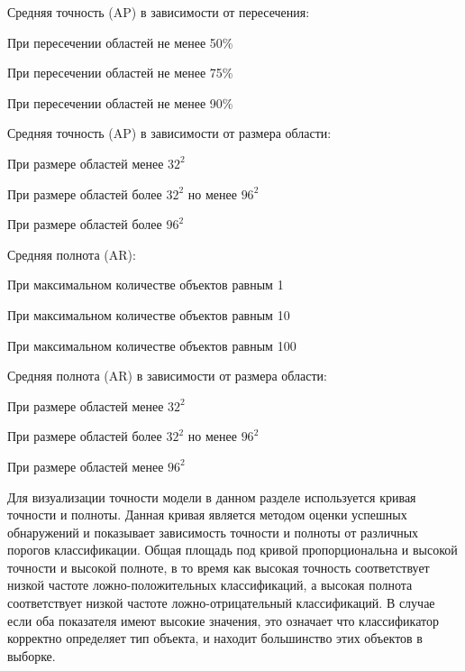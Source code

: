 %
\begin{itemize*}
  \item Средняя точность (AP) в зависимости от пересечения:
	\begin{itemize*}
	  \item При пересечении областей не менее 50\%
	  \item При пересечении областей не менее 75\%
	  \item При пересечении областей не менее 90\%	  
	\end{itemize*}
  \item Средняя точность (AP) в зависимости от размера области:
	\begin{itemize*}
	  \item При размере областей менее \(32^2\)
	  \item При размере областей более \(32^2\) но менее \(96^2\)
	  \item При размере областей более \(96^2\)
	\end{itemize*}
  \item Средняя полнота (AR):
	\begin{itemize*}
	  \item При максимальном количестве объектов равным 1
	  \item При максимальном количестве объектов равным 10
	  \item При максимальном количестве объектов равным 100
	\end{itemize*}
  \item Средняя полнота (AR) в зависимости от размера области:
	\begin{itemize*}
	  \item При размере областей менее \(32^2\)
	  \item При размере областей более \(32^2\) но менее \(96^2\)
	  \item При размере областей менее \(96^2\)
	\end{itemize*}
\end{itemize*}
%

Для визуализации точности модели в данном разделе используется кривая точности и полноты. Данная кривая является методом оценки успешных обнаружений и показывает зависимость точности и полноты от различных порогов классификации. Общая площадь под кривой пропорциональна и высокой точности и высокой полноте, в то время как высокая точность соответствует низкой частоте ложно-положительных классификаций, а высокая полнота соответствует низкой частоте ложно-отрицательный классификаций. В случае если оба показателя имеют высокие значения, это означает что классификатор корректно определяет тип объекта, и находит большинство этих объектов в выборке.

